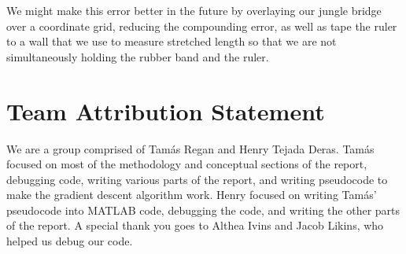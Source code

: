 \documentclass[10pt,letterpaper,onecolumn,report]{tau-class/tau}
\begin{document}
    We might make this error better in the future by overlaying our jungle bridge over a coordinate grid, reducing the compounding error, as well as tape the ruler to a wall that we use to measure stretched length so that we are not simultaneously holding the rubber band and the ruler.

\section{Team Attribution Statement}

We are a group comprised of Tamás Regan and Henry Tejada Deras. Tamás focused on most of the methodology and conceptual sections of the report, debugging code, writing various parts of the report, and writing pseudocode to make the gradient descent algorithm work. Henry focused on writing Tamás’ pseudocode into MATLAB code, debugging the code, and writing the other parts of the report. A special thank you goes to Althea Ivins and Jacob Likins, who helped us debug our code.
\end{document}
